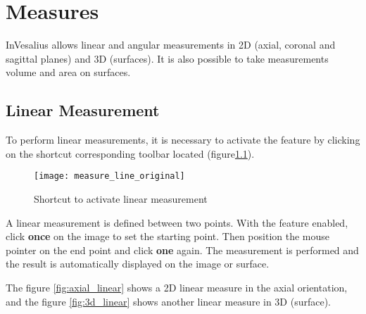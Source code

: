 \chapter{Measures}

InVesalius allows linear and angular measurements in 2D (axial, coronal and sagittal planes) and 3D (surfaces). It is also possible to take measurements volume and area on surfaces.

\section{Linear Measurement}


To perform linear measurements, it is necessary to activate the feature by clicking on the shortcut corresponding toolbar located (figure\ref{fig:measure_line_original}).

\begin{figure}[!htb]
\centering
\texttt{[image: measure\_line\_original]}
\caption{Shortcut to activate linear measurement}
\label{fig:measure_line_original}
\end{figure}


A linear measurement is defined between two points. With the feature enabled, click \textbf{once} on the image to set the starting point. Then position the mouse pointer on the end point and click \textbf{one} again. The measurement is performed and the result is automatically displayed on the image or surface.


The figure \ref{fig:axial_linear} shows a 2D linear measure in the axial orientation, and the figure \ref{fig:3d_linear} shows another linear measure in 3D (surface).


